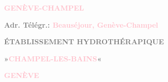 \pstart
           \begin{otherlanguage}{french}\textcolor{gray}{\textbf{\textbf{\textcolor{pink}{GENÈVE-CHAMPEL}\ledrightnote{\textcolor{pink}{Champel}}}}}\end{otherlanguage}\pend
           
\pstart
           \begin{otherlanguage}{french}\textcolor{gray}{\textbf{Adr. Télégr.: \textcolor{pink}{Beauséjour, Genève-Champel}\ledrightnote{\textcolor{pink}{Hôtel Beau-Séjour}}}}\end{otherlanguage}\pend
           
\pstart
           \begin{otherlanguage}{french}\textcolor{gray}{\textbf{ÉTABLISSEMENT HYDROTHÉRAPIQUE}}\end{otherlanguage}\pend
           
\pstart
           \begin{otherlanguage}{french}\textcolor{gray}{\textbf{»\textcolor{pink}{CHAMPEL-LES-BAINS}\ledrightnote{\textcolor{pink}{Champel}}«}}\end{otherlanguage}\pend
           
\pstart
           \begin{otherlanguage}{french}\textcolor{gray}{\textbf{\textbf{\textcolor{pink}{GENÈVE}\ledrightnote{\textcolor{pink}{Genf}}}}}\end{otherlanguage}\pend
           

